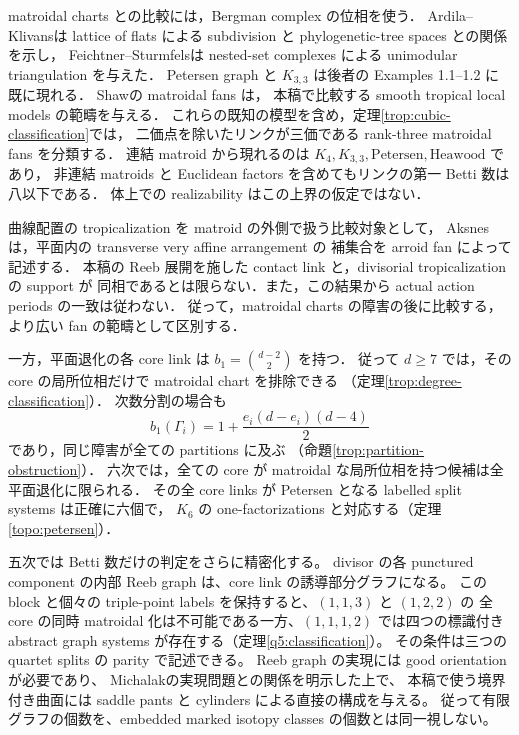 matroidal charts との比較には，Bergman complex の位相を使う．
Ardila--Klivans\cite{ArdilaKlivans}は lattice of flats による subdivision と
phylogenetic-tree spaces との関係を示し，
Feichtner--Sturmfels\cite[Theorem 4.1]{FeichtnerSturmfels}は
nested-set complexes による unimodular triangulation を与えた．
Petersen graph と $K_{3,3}$ は後者の Examples 1.1--1.2 に既に現れる．
Shaw\cite[\S2.4]{Shaw}の matroidal fans は，
本稿で比較する smooth tropical local models の範疇を与える．
これらの既知の模型を含め，定理\ref{trop:cubic-classification}では，
二価点を除いたリンクが三価である rank-three matroidal fans を分類する．
連結 matroid から現れるのは
$K_4,K_{3,3},\mathrm{Petersen},\mathrm{Heawood}$ であり，
非連結 matroids と Euclidean factors を含めてもリンクの第一 Betti 数は八以下である．
体上での realizability はこの上界の仮定ではない．

曲線配置の tropicalization を matroid の外側で扱う比較対象として，
Aksnes\cite[Theorem 4.15]{Aksnes}は，平面内の transverse very affine arrangement の
補集合を arroid fan によって記述する．
本稿の Reeb 展開を施した contact link と，divisorial tropicalization の support が
同相であるとは限らない．また，この結果から actual action periods の一致は従わない．
従って，matroidal charts の障害の後に比較する，より広い fan の範疇として区別する．

一方，平面退化の各 core link は
$b_1=\binom{d-2}{2}$ を持つ．
従って $d\geq7$ では，その core の局所位相だけで matroidal chart を排除できる
（定理\ref{trop:degree-classification}）．
次数分割の場合も
\[
 b_1(\Gamma_i)=1+\frac{e_i(d-e_i)(d-4)}2
\]
であり，同じ障害が全ての partitions に及ぶ
（命題\ref{trop:partition-obstruction}）．
六次では，全ての core が matroidal な局所位相を持つ候補は全平面退化に限られる．
その全 core links が Petersen となる labelled split systems は正確に六個で，
$K_6$ の one-factorizations と対応する（定理\ref{topo:petersen}）．

五次では Betti 数だけの判定をさらに精密化する。
divisor の各 punctured component の内部 Reeb graph は、core link の誘導部分グラフになる。
この block と個々の triple-point labels を保持すると、$(1,1,3)$ と $(1,2,2)$ の
全 core の同時 matroidal 化は不可能である一方、$(1,1,1,2)$ では四つの標識付き
abstract graph systems が存在する（定理\ref{q5:classification}）。
その条件は三つの quartet splits の parity で記述できる。
Reeb graph の実現には good orientation が必要であり、
Michalak\cite[Definition 2.2, Theorem 5.6]{MichalakReeb}の実現問題との関係を明示した上で、
本稿で使う境界付き曲面には saddle pants と cylinders による直接の構成を与える。
従って有限グラフの個数を、embedded marked isotopy classes の個数とは同一視しない。


